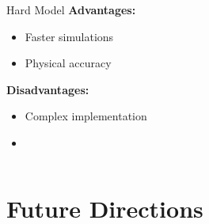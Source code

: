 \documentclass[10pt,t]{beamer}
\begin{document}
\begin{frame}
\begin{columns}
\begin{column}{0.5\textwidth}
\begin{exampleblock}{Hard Model }
                \textbf{Advantages:}
                \begin{itemize}
                    \item Faster simulations
                    \item Physical accuracy
                \end{itemize}

                \textbf{Disadvantages:}
                \begin{itemize}
                    \item Complex implementation
                    \item[]
                \end{itemize}
            \end{exampleblock}
        \end{column}

    \end{columns}

\end{frame}


\section{Future Directions}
\end{document}
